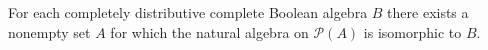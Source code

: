 For each completely distributive complete Boolean algebra $B$ there exists a nonempty set $A$ for which the natural algebra on $\mathcal{P}(A)$ is isomorphic to $B$.
